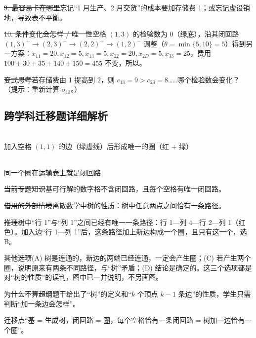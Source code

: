 \st{9. 最容易卡在哪里}忘记“1 月生产、2 月交货”的成本要加存储费 1；或忘记虚设销地，导致表不平衡。\par
\st{10. 条件变化会怎样 / 唯一性}空格 $(1,3)$ 的检验数为 0（绿底），沿其闭回路 $(1,3)^+\to(2,3)^-\to(2,2)^+\to(1,2)^-$ 调整（$\theta=\min\{5,10\}=5$）得到另一方案：$x_{11}=20,x_{12}=5,x_{13}=5,x_{22}=20,x_{2D}=5,x_{33}=25$，费用 $100+30+35+140+150=455$ 不变，所以。\par
\st{变式思考}若存储费由 1 提高到 2，则 $c_{13}=9>c_{23}=8$……哪个检验数会变化？（提示：重新计算 $\sigma_{13}$。）

\subsection*{跨学科迁移题详细解析}
\begin{center}
\begin{minipage}{0.48\linewidth}\centering
{}\\{\small 加入空格 $(1,1)$ 的边（绿虚线）后形成唯一的圈（红 + 绿）}
\end{minipage}\hfill
\begin{minipage}{0.48\linewidth}\centering
{}\\{\small 同一个圈在运输表上就是闭回路}
\end{minipage}
\end{center}
\st{当前专题知识}基可行解的数字格不含闭回路，且每个空格有唯一闭回路。\par
\st{借用的外部情境}离散数学中树的性质：树中任意两点之间恰有一条路径。\par
\st{推理}树中“行 1”与“列 1”之间已经有唯一一条路径：行 1—列 4—行 2—列 1（红色）。加入边“行 1—列 1”后，这条路径加上新边构成一个圈，且只有这一个，选 B。\par
\st{其他选项}(A) 树是连通的，新边的两端已经连通，一定会产生圈；(C) 若产生两个圈，说明原来有两条不同路径，与“树”矛盾；(D) 结论是确定的。这三个选项都是对“树的性质”的误判，图中已一并说明，不另画图。\par
\st{为什么不算超纲}题干给出了“树”的定义和“$k$ 个顶点 $k-1$ 条边”的性质，学生只需判断“加一条边会怎样”。\par
\st{迁移点}“基 = 生成树，闭回路 = 圈，每个空格恰有一条闭回路 = 树加一边恰有一个圈”。

